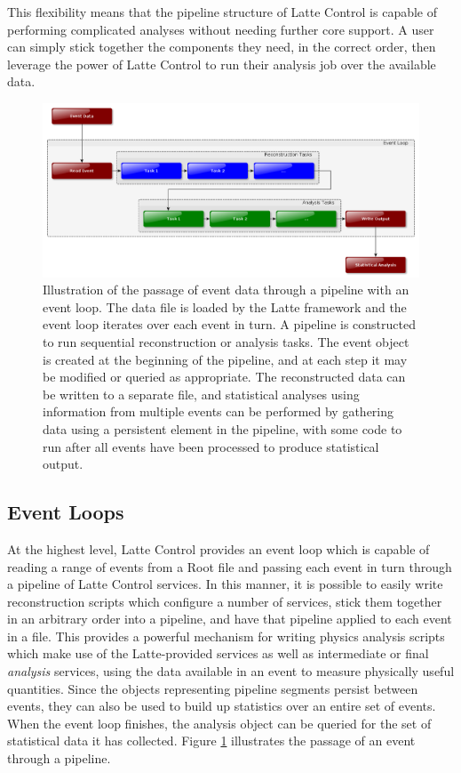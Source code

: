 This flexibility means that the pipeline structure of Latte Control is capable of performing complicated analyses without needing further core support. A user can simply stick together the components they need, in the correct order, then leverage the power of Latte Control to run their analysis job over the available data.

\begin{figure}
\centering
\includegraphics[width=\textwidth]{chapters/latte_images/pipeline}
\caption[Pipeline of reconstruction and analysis tasks, with an event loop]{\label{fig:pipeline}Illustration of the passage of event data through a pipeline with an event loop. The data file is loaded by the Latte framework and the event loop iterates over each event in turn. A pipeline is constructed to run sequential reconstruction or analysis tasks. The event object is created at the beginning of the pipeline, and at each step it may be modified or queried as appropriate. The reconstructed data can be written to a separate file, and statistical analyses using information from multiple events can be performed by gathering data using a persistent element in the pipeline, with some code to run after all events have been processed to produce statistical output.}
\end{figure}

\subsection{Event Loops}\label{sec:latte-event-loops}
At the highest level, Latte Control provides an event loop which is capable of reading a range of events from a {\sc Root} file and passing each event in turn through a pipeline of Latte Control services. In this manner, it is possible to easily write reconstruction scripts which configure a number of services, stick them together in an arbitrary order into a pipeline, and have that pipeline applied to each event in a file. This provides a powerful mechanism for writing physics analysis scripts which make use of the Latte-provided services as well as intermediate or final \emph{analysis} services, using the data available in an event to measure physically useful quantities. Since the objects representing pipeline segments persist between events, they can also be used to build up statistics over an entire set of events. When the event loop finishes, the analysis object can be queried for the set of statistical data it has collected. Figure \ref{fig:pipeline} illustrates the passage of an event through a pipeline.


